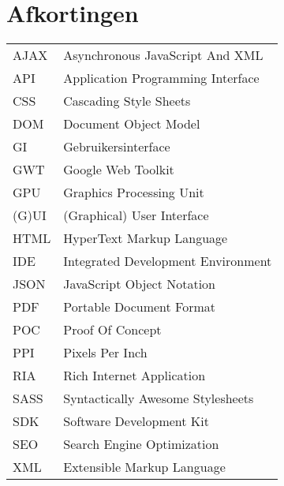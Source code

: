 \documentclass[master=cws,dutch]{kulemt}
\begin{document}
\section*{Afkortingen}
\begin{flushleft}
  \renewcommand{\arraystretch}{1.1}
  \begin{tabularx}{\textwidth}{@{}p{12mm}X@{}}
     AJAX & Asynchronous JavaScript And XML \\
     API & Application Programming Interface \\
     CSS & Cascading Style Sheets \\
     DOM & Document Object Model \\
     GI & Gebruikersinterface \\
     GWT & Google Web Toolkit \\
     GPU & Graphics Processing Unit \\
     (G)UI & (Graphical) User Interface \\
     HTML & HyperText Markup Language \\
     IDE & Integrated Development Environment \\
     JSON & JavaScript Object Notation \\
     PDF & Portable Document Format \\
     POC & Proof Of Concept \\
     PPI & Pixels Per Inch \\
     RIA & Rich Internet Application \\
     SASS & Syntactically Awesome Stylesheets \\
     SDK & Software Development Kit \\
     SEO & Search Engine Optimization \\
     XML & Extensible Markup Language
  \end{tabularx}
\end{flushleft}
\end{document}
